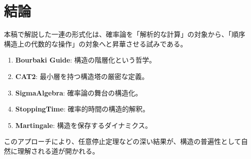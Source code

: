 \documentclass[a4paper,11pt]{ltjsarticle}
\theoremstyle{definition}
\begin{document}
\section{結論}
本稿で解説した一連の形式化は、確率論を「解析的な計算」の対象から、「順序構造上の代数的な操作」の対象へと昇華させる試みである。
\begin{enumerate}
    \item \textbf{Bourbaki Guide}: 構造の階層化という哲学。
    \item \textbf{CAT2}: 最小層を持つ構造塔の厳密な定義。
    \item \textbf{SigmaAlgebra}: 確率論の舞台の構造化。
    \item \textbf{StoppingTime}: 確率的時間の構造的解釈。
    \item \textbf{Martingale}: 構造を保存するダイナミクス。
\end{enumerate}
このアプローチにより、任意停止定理などの深い結果が、構造の普遍性として自然に理解される道が開かれる。
\end{document}
